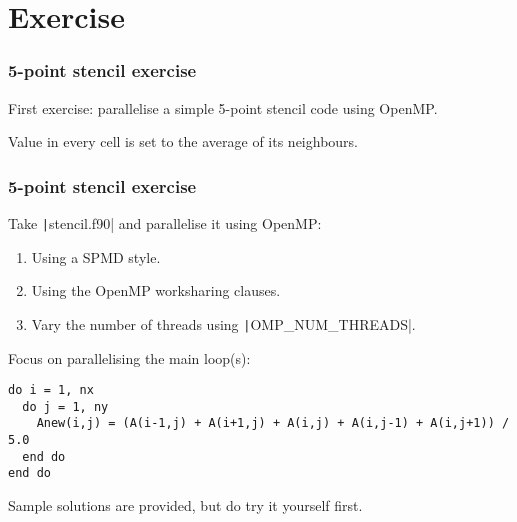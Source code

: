 \documentclass{beamer}
\begin{document}
\section{Exercise}
\begin{frame}
\frametitle{5-point stencil exercise}
First exercise: parallelise a simple 5-point stencil code using OpenMP.

\begin{center}
\end{center}

Value in every cell is set to the average of its neighbours.
\end{frame}

\begin{frame}[fragile]
\frametitle{5-point stencil exercise}
Take \texttt|stencil.f90| and parallelise it using OpenMP:
\begin{enumerate}
  \item Using a SPMD style.
  \item Using the OpenMP worksharing clauses.
  \item Vary the number of threads using \texttt|OMP_NUM_THREADS|.
\end{enumerate}

Focus on parallelising the main loop(s):
\begin{verbatim}
do i = 1, nx
  do j = 1, ny
    Anew(i,j) = (A(i-1,j) + A(i+1,j) + A(i,j) + A(i,j-1) + A(i,j+1)) / 5.0
  end do
end do
\end{verbatim}

Sample solutions are provided, but do try it yourself first.

\end{frame}
\end{document}
